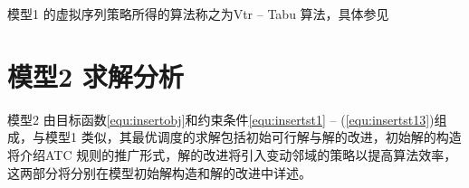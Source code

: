 模型1 的虚拟序列策略所得的算法称之为Vtr -- Tabu 算法，具体参见




\section{模型2 求解分析}
模型2 由目标函数\eqref{equ:insertobj}和约束条件\eqref{equ:insertst1} -- (\ref{equ:insertst13})组成，与模型1 类似，其最优调度的求解包括初始可行解与解的改进，初始解的构造将介绍ATC 规则的推广形式，解的改进将引入变动邻域的策略以提高算法效率，这两部分将分别在模型初始解构造和解的改进中详述。
